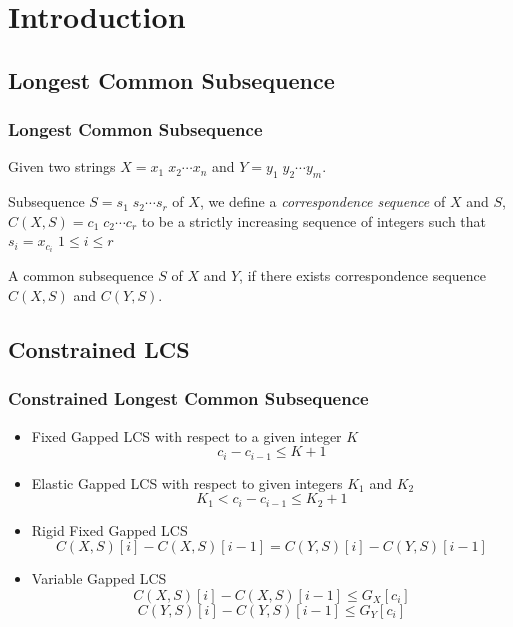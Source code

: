 \section{Introduction}

\subsection{Longest Common Subsequence}
\begin{frame}
    \frametitle{Longest Common Subsequence}
    Given two strings $X = x_1 \; x_2 \cdots x_n$ and $Y = y_1 \; y_2 \cdots y_m$.
    \begin{definition}
    	Subsequence $S = s_1 \; s_2 \cdots s_r$ of $X$, we define a 
    	\emph{correspondence sequence} of $X$ and $S$, $C(X, S) = c_1 \; c_2 \cdots c_r$ 
    	to be a strictly increasing sequence of integers such that 
    	$s_i = x_{c_i}$ $1 \le i \le r$
	\end{definition}
	\begin{definition}
		A common subsequence $S$ of $X$ and $Y$, if there exists correspondence sequence
		$C(X, S)$ and $C(Y, S)$.
	\end{definition}
\end{frame}

\subsection{Constrained LCS}
\begin{frame}
    \frametitle{Constrained Longest Common Subsequence}
    \begin{itemize}
    	\item Fixed Gapped LCS with respect to a given integer $K$
    		$$c_i - c_{i-1} \le K+1$$
    	\item Elastic Gapped LCS with respect to given integers $K_1$ and $K_2$
    		$$K_1 < c_i - c_{i-1} \le K_2 + 1$$
    	\item Rigid Fixed Gapped LCS
    		$$C(X, S)[i] - C(X, S)[i-1] = C(Y, S)[i] - C(Y, S)[i-1]$$
    	\item Variable Gapped LCS
    		$$C(X, S)[i] - C(X, S)[i-1] \le G_{X}[c_i]$$
    		$$C(Y, S)[i] - C(Y, S)[i-1] \le G_{Y}[c_i]$$
    \end{itemize}
\end{frame}

